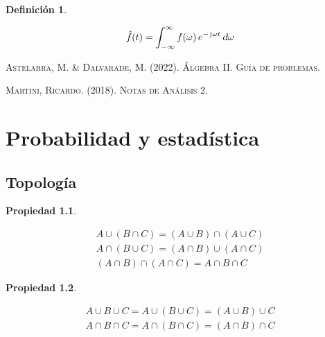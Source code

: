 \documentclass[a5paper,12pt,twoside]{book}
\newtheorem{defn}{{Definición}}[chapter]
\newtheorem{prop}{{Propiedad}}[chapter]
\begin{document}
\begin{mdframed}[style=DefinitionFrame]
    \begin{defn}
    \end{defn}
    \begin{equation*}
        \hat{f}(t) = \int_{-\infty}^{\infty} f(\omega) \, e^{-\mkern2mu\mathrm{j}\mkern1mu \omega t} \, \textsl{d} \omega
    \end{equation*}
\end{mdframed}


\begin{thebibliography}{2}
     \textsc{Astelarra, M. \& Dalvarade, M. (2022). Álgebra II. Guía de problemas.}
    
     \textsc{Martini, Ricardo. (2018). Notas de Análisis 2.}
\end{thebibliography}


\chapter{Probabilidad y estadística}


\section{Topología}

\begin{mdframed}[style=PropertyFrame]
    \begin{prop}
    \end{prop}
    \begin{gather*}
        A \cup (B \cap C) = (A \cup B) \cap (A \cup C)
        \\
        A \cap (B \cup C) = (A \cap B) \cup (A \cap C)
        \\[1ex]
        (A \cap B) \cap (A \cap C) = A \cap B \cap C
    \end{gather*}
\end{mdframed}

\begin{mdframed}[style=PropertyFrame]
    \begin{prop}
    \end{prop}
    \begin{gather*}
        A \cup B \cup C = A \cup (B \cup C) = (A \cup B) \cup C
        \\
        A \cap B \cap C = A \cap (B \cap C) = (A \cap B) \cap C
    \end{gather*}
\end{mdframed}
\end{document}

